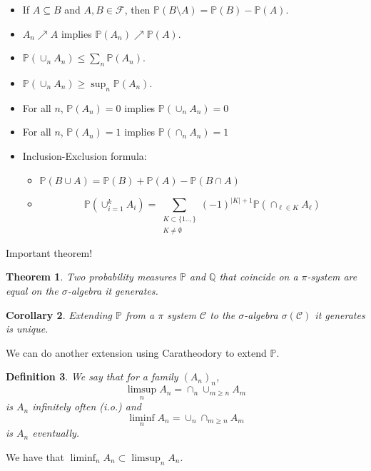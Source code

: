 \documentclass{article}
\newtheorem{theorem}{Theorem}
\newtheorem{corollary}[theorem]{Corollary}
\newtheorem{definition}[theorem]{Definition}
\theoremstyle{definition}
\numberwithin{theorem}{section}
\numberwithin{equation}{section}
\begin{document}
\begin{itemize}
	\item If $A \subseteq B$ and $A, B \in \mathcal{F}$, then $\mathbb{P}(B \setminus A) = \mathbb{P}(B) - \mathbb{P}(A)$.
	\item $A_n \nearrow A$ implies $\mathbb{P}(A_n) \nearrow \mathbb{P}(A)$.
	\item $\mathbb{P}\left(\cup_n A_n\right) \leq \sum_n \mathbb{P}(A_n)$. 
	\item $\mathbb{P}\left(\cup_n A_n\right) \geq \sup_n \mathbb{P}(A_n)$. 
	\item For all $n$, $\mathbb{P}(A_n) = 0$ implies $\mathbb{P}(\cup_n A_n) = 0$
	\item For all $n$, $\mathbb{P}(A_n) = 1$ implies $\mathbb{P}(\cap_n A_n) = 1$
	\item Inclusion-Exclusion formula:
	
	\begin{itemize}
		\item 	$\mathbb{P}(B \cup A) = \mathbb{P}(B) + \mathbb{P}(A) - \mathbb{P}(B \cap A)$
		\item\begin{equation}
			 \mathbb{P}\left(\cup_{i = 1}^k A_i\right) = \sum_{\substack{K \subset \lbrace 1 .. , \rbrace \\ K \neq \emptyset } } (-1)^{|K| + 1} \mathbb{P}\left(\cap_{\ell \in K} A_\ell\right)
		\end{equation}
		
	\end{itemize}
\end{itemize}

Important theorem!
\begin{theorem}
	Two probability measures $\mathbb{P}$ and $\mathbb{Q}$ that coincide on a $\pi$-system are equal on the $\sigma$-algebra it generates.
\end{theorem}

\begin{corollary}
	Extending $\mathbb{P}$ from a $\pi$ system $\mathcal{C}$ to the $\sigma$-algebra $\sigma(\mathcal{C})$ it generates is unique.
\end{corollary}

We can do another extension using Caratheodory to extend $\mathbb{P}$.

\begin{definition}
	We say that for a family $(A_n)_n$, 
	\begin{equation}
		\limsup_n A_n = \cap_n \cup_{m \geq n} A_m
	\end{equation}
	is $A_n$ infinitely often (i.o.)
	and 
	\begin{equation}
		\liminf_n A_n = \cup_n \cap_{m \geq n} A_m 
	\end{equation}
	is $A_n$ eventually. 
\end{definition}
We have that $\liminf_n A_n \subset \limsup_n A_n$. 
\end{document}

